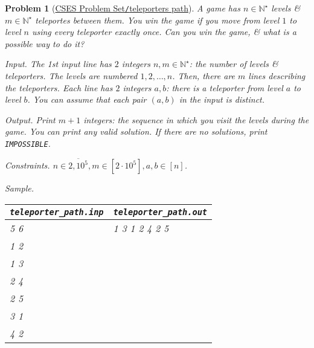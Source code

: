 \documentclass{article}
\newtheorem{problem}{Problem}
\begin{document}
\begin{problem}[\href{https://cses.fi/problemset/task/1693}{CSES Problem Set{\tt/}teleporters path}]
    A game has $n\in\mathbb{N}^\star$ levels \& $m\in\mathbb{N}^\star$ teleportes between them. You win the game if you move from level $1$ to level $n$ using every teleporter exactly once. Can you win the game, \& what is a possible way to do it?
    \item {\sf Input.} The 1st input line has $2$ integers $n,m\in\mathbb{N}^\star$: the number of levels \& teleporters. The levels are numbered $1,2,\ldots,n$. Then, there are $m$ lines describing the teleporters. Each line has $2$ integers $a,b$: there is a teleporter from level $a$ to level $b$. You can assume that each pair $(a,b)$ in the input is distinct.
    \item {\sf Output.} Print $m + 1$ integers: the sequence in which you visit the levels during the game. You can print any valid solution. If there are no solutions, print {\tt IMPOSSIBLE}.
    \item {\sf Constraints.} $n\in\overline{2,10^5},m\in[2\cdot10^5],a,b\in[n]$.
    \item {\sf Sample.}
    \begin{table}[H]
        \centering
        \begin{tabular}{|l|l|}
            \hline
            \verb|teleporter_path.inp| & \verb|teleporter_path.out| \\
            \hline
            5 6 & 1 3 1 2 4 2 5 \\
            1 2 & \\
            1 3 & \\
            2 4 & \\
            2 5 & \\
            3 1 & \\
            4 2 & \\
            \hline
        \end{tabular}
    \end{table}
\end{problem}
\end{document}
